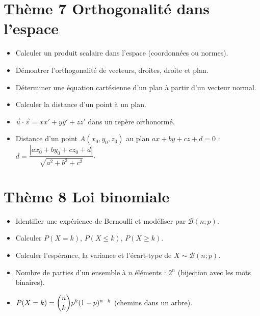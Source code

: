 \documentclass[11pt,a4paper,openany]{book}
\theoremstyle{definition}
\newcommand{\vc}[1]{\overrightarrow{#1}}
\begin{document}
    \section*{Thème 7 \textemdash{} Orthogonalité dans l'espace}
    \begin{capacitesbox}
    \begin{itemize}
        \item Calculer un produit scalaire dans l'espace (coordonnées ou
              normes).
        \item Démontrer l'orthogonalité de vecteurs, droites, droite et plan.
        \item Déterminer une équation cartésienne d'un plan à partir d'un
              vecteur normal.
        \item Calculer la distance d'un point à un plan.
    \end{itemize}
    \end{capacitesbox}
    \begin{demoprogbox}
    \begin{itemize}
        \item $\vc{u}\cdot\vc{v}=xx'+yy'+zz'$ dans un repère orthonormé.
        \item Distance d'un point $A(x_0,y_0,z_0)$ au plan $ax+by+cz+d=0$ :
              $d=\dfrac{|ax_0+by_0+cz_0+d|}{\sqrt{a^2+b^2+c^2}}$.
    \end{itemize}
    \end{demoprogbox}

    \section*{Thème 8 \textemdash{} Loi binomiale}
    \begin{capacitesbox}
    \begin{itemize}
        \item Identifier une expérience de Bernoulli et modéliser par
              $\mathcal{B}(n;p)$.
        \item Calculer $P(X=k)$, $P(X\leq k)$, $P(X\geq k)$.
        \item Calculer l'espérance, la variance et l'écart-type de
              $X\sim\mathcal{B}(n;p)$.
    \end{itemize}
    \end{capacitesbox}
    \begin{demoprogbox}
    \begin{itemize}
        \item Nombre de parties d'un ensemble à $n$ éléments : $2^n$
              (bijection avec les mots binaires).
        \item $P(X=k)=\dbinom{n}{k}p^k(1-p)^{n-k}$ (chemins dans un arbre).
    \end{itemize}
    \end{demoprogbox}
\end{document}
